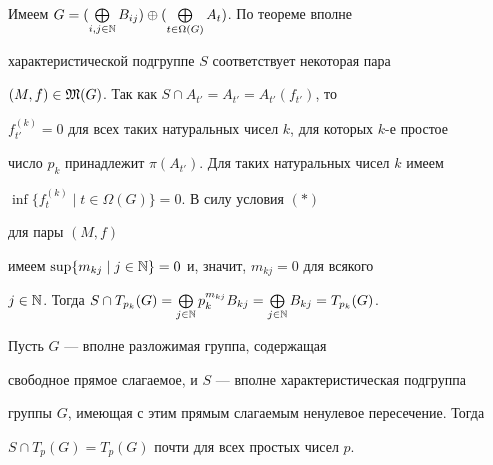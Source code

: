 \begin{pf}


Имеем $G=(\bigoplus\limits_{i,j\in\Bbb N}B_{ij})


\oplus(\bigoplus\limits_{t\in\Omega(G)}A_t)$. По теореме вполне


характеристической подгруппе $S$ соответствует некоторая пара


$(M, f)\in\frak M(G)$. Так как $S\cap A_{t'}=A_{t'}=A_{t'}(f_{t'})$, то


$f_{t'}^{(k)}=0$ для всех таких натуральных чисел $k$, для которых $k$-е простое


число $p_k$ принадлежит $\pi(A_{t'})$. Для таких натуральных чисел $k$ имеем


$\inf\{f_t^{(k)}\mid t\in\Omega(G)\}=0$. В силу условия $(\ast)$


для пары $(M, f)$


имеем $\sup\{m_{kj}\mid j\in\Bbb N\}=0$ и, значит, $m_{kj}=0$ для всякого


$j\in\Bbb N$. Тогда $S\cap T_{p_k}(G)=


\bigoplus\limits_{j\in\Bbb N}p_k^{m_{kj}}B_{kj}=


\bigoplus\limits_{j\in\Bbb N}B_{kj}=T_{p_k}(G)$.


\end{pf}





\begin{cor}


Пусть $G$ --- вполне разложимая группа, содержащая


свободное прямое слагаемое, и $S$ --- вполне характеристическая подгруппа


группы $G$, имеющая с этим прямым слагаемым ненулевое пересечение. Тогда


$S\cap T_p(G)=T_p(G)$ почти для всех простых чисел $p$.


\end{cor}





